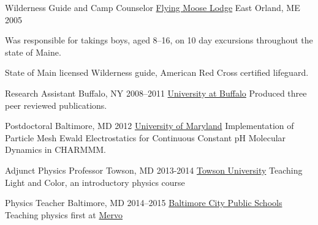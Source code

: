 


\begin{cventries}
  \cventry
    {Wilderness Guide and Camp Counselor} %
    {\href{www.flyingmooselodge.com}{Flying Moose Lodge}} %
    {East Orland, ME} %
    {2005} %
    {
    \begin{cvitems}
      \item {Was responsible for takings boys, aged 8--16, on 10 day excursions throughout the state of Maine.}
      \item {State of Main licensed Wilderness guide, American Red Cross certified lifeguard.}
    \end{cvitems}
    }

  \cventry
    {Research Assistant} %
    {Buffalo, NY} %
    {2008--2011}   %
    {\href{www.buffalo.edu}{University at Buffalo}} %
	{Produced three peer reviewed publications.}


\cventry
    {Postdoctoral} %
    {Baltimore, MD} %
    {2012}          %
    {\href{www.umaryland.edu}{University of Maryland}} %
    {Implementation of Particle Mesh Ewald Electrostatics for Continuous Constant pH Molecular Dynamics in CHARMMM.} %

\cventry
    {Adjunct Physics Professor} %
    {Towson, MD} %
    {2013-2014}  %
    {\href{www.towson.edu}{Towson University}} %
    {Teaching Light and Color, an introductory physics course} %

\cventry
    {Physics Teacher} %
    {Baltimore, MD} %
    {2014--2015}    %
    {\href{http://www.baltimorecityschools.org/}{Baltimore City Public Schools}} %
    {Teaching physics first at \href{http://mervo.org}{Mervo}} %


\end{cventries}
